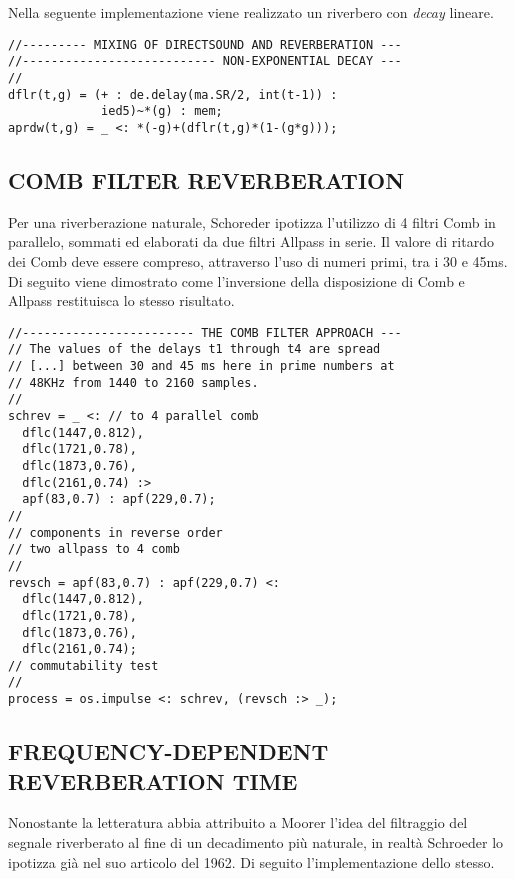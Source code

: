 Nella seguente implementazione viene realizzato un riverbero con \textit{decay}
lineare.

\begin{lstlisting}
//--------- MIXING OF DIRECTSOUND AND REVERBERATION ---
//--------------------------- NON-EXPONENTIAL DECAY ---
//
dflr(t,g) = (+ : de.delay(ma.SR/2, int(t-1)) :
             ied5)~*(g) : mem;
aprdw(t,g) = _ <: *(-g)+(dflr(t,g)*(1-(g*g)));
\end{lstlisting}

\subsection*{COMB FILTER REVERBERATION}

Per una riverberazione naturale, Schoreder ipotizza l'utilizzo di 4 filtri
Comb in parallelo, sommati ed elaborati da due filtri Allpass in serie. Il
valore di ritardo dei Comb deve essere compreso, attraverso l'uso di numeri
primi, tra i 30 e 45ms. Di seguito viene dimostrato come l'inversione
della disposizione di Comb e Allpass restituisca lo stesso risultato.

\begin{lstlisting}
//------------------------ THE COMB FILTER APPROACH ---
// The values of the delays t1 through t4 are spread
// [...] between 30 and 45 ms here in prime numbers at
// 48KHz from 1440 to 2160 samples.
//
schrev = _ <: // to 4 parallel comb
  dflc(1447,0.812),
  dflc(1721,0.78),
  dflc(1873,0.76),
  dflc(2161,0.74) :>
  apf(83,0.7) : apf(229,0.7);
//
// components in reverse order
// two allpass to 4 comb
//
revsch = apf(83,0.7) : apf(229,0.7) <:
  dflc(1447,0.812),
  dflc(1721,0.78),
  dflc(1873,0.76),
  dflc(2161,0.74);
// commutability test
//
process = os.impulse <: schrev, (revsch :> _);
\end{lstlisting}

\subsection*{FREQUENCY-DEPENDENT REVERBERATION TIME}

Nonostante la letteratura abbia attribuito a Moorer l'idea del filtraggio
del segnale riverberato al fine di un decadimento più naturale, in realtà
Schroeder lo ipotizza già nel suo articolo del 1962. Di seguito
l'implementazione dello stesso.

